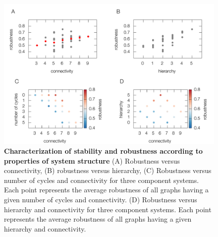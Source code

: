 \begin{figure}[!ht]
\centering
\noindent\includegraphics[width=1.0\columnwidth]{fig/combinedfigs.pdf}
\caption{{\bf Characterization of stability and robustness according to properties of system structure} (A) Robustness versus connectivity, (B) robustness versus hierarchy, (C) Robustness versus number of cycles and connectivity for three component systems. Each point represents the average robustness of all graphs having a given number of cycles and connectivity. (D) Robustness versus hierarchy and connectivity for three component systems. Each point represents the average robustness of all graphs having a given hierarchy and connectivity.
}
\label{fig:combined}
\end{figure}





